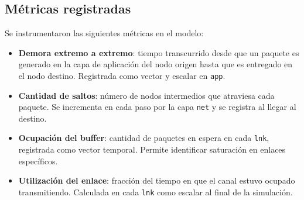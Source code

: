 \documentclass[10pt,letterpaper,twocolumn]{article}
\newcommand{\coltablesetup}{%
  \scriptsize
  \setlength{\tabcolsep}{3pt}%
  \renewcommand{\arraystretch}{1.08}%
}
\begin{document}
\begin{table}[!ht]
  \centering
  \caption{Configuración experimental por escenario.}
  \label{tab:config}
  \coltablesetup
\end{table}

\subsection{Métricas registradas}

Se instrumentaron las siguientes métricas en el modelo:

\begin{itemize}
  \item \textbf{Demora extremo a extremo}: tiempo transcurrido desde que un
  paquete es generado en la capa de aplicación del nodo origen hasta que es
  entregado en el nodo destino. Registrada como vector y escalar en
  \texttt{app}.
  \item \textbf{Cantidad de saltos}: número de nodos intermedios que atraviesa
  cada paquete. Se incrementa en cada paso por la capa \texttt{net} y se
  registra al llegar al destino.
  \item \textbf{Ocupación del buffer}: cantidad de paquetes en espera en cada
  \texttt{lnk}, registrada como vector temporal. Permite identificar
  saturación en enlaces específicos.
  \item \textbf{Utilización del enlace}: fracción del tiempo en que el canal
  estuvo ocupado transmitiendo. Calculada en cada \texttt{lnk} como escalar
  al final de la simulación.
\end{itemize}
\end{document}
